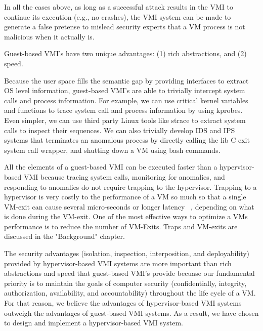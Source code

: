 \documentclass{report}
\begin{document}
\begin{spacing}{1.5}
{\large
\noindent In all the cases above, as long as a successful attack results in the VMI to continue its execution (e.g., no crashes), the VMI system can be made to generate a false pretense to mislead security experts that a VM process is not malicious when it actually is.
\newline
}


{\large
\noindent Guest-based VMI's have two unique advantages: (1) rich abstractions, and (2) speed. 
\newline
}


{\large
\noindent Because the user space fills the semantic gap by providing interfaces to extract OS level information, guest-based VMI's are able to trivially intercept system calls and process information. For example, we can use critical kernel variables and functions to trace system call and process information by using kprobes. Even simpler, we can use third party Linux tools like strace to extract system calls to inspect their sequences. We can also trivially develop IDS and IPS systems that terminates an anomalous process by directly calling the lib C exit system call wrapper, and shutting down a VM using bash commands.
\newline
}


{\large
\noindent All the elements of a guest-based VMI can be executed faster than a hypervisor-based VMI because tracing system calls, monitoring for anomalies, and responding to anomalies do not require trapping to the hypervisor. Trapping to a hypervisor is very costly to the performance of a VM so much so that a single VM-exit can cause several micro-seconds or longer latency ~\cite{poon2012improving}, depending on what is done during the VM-exit. One of the most effective ways to optimize a VMs performance is to reduce the number of VM-Exits. Traps and VM-exits are discussed in the "Background" chapter. 
\newline
}


{\large
\noindent The security advantages (isolation, inspection, interposition, and deployability) provided by hypervisor-based VMI systems are more important than rich abstractions and speed that guest-based VMI's provide becuase our fundamental priority is to maintain the goals of computer security (confidentially, integrity, authorization, availability, and accountability) throughout the life cycle of a VM. For that reason, we believe the advantages of hypervisor-based VMI systems outweigh the advantages of guest-based VMI systems. As a result, we have chosen to design and implement a hypervisor-based VMI system.
\newline
}

















\end{spacing}
\end{document}
